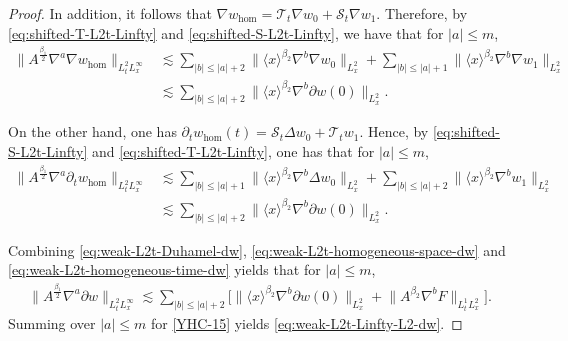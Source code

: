 \documentclass[11pt,twoside]{article}
\theoremstyle{plain}
\theoremstyle{definition}
\theoremstyle{assumption}
\numberwithin{equation}{section}
\begin{document}
\begin{proof}
		In addition, it follows that $\nabla w_{\mathrm{hom}}
		=\mathcal T_t\nabla w_0+\mathcal S_t\nabla w_1$.
		Therefore, by \eqref{eq:shifted-T-L2t-Linfty} and
		\eqref{eq:shifted-S-L2t-Linfty}, we have that for \(|a|\le m\),
		\begin{equation}
			\label{eq:weak-L2t-homogeneous-space-dw}
			\begin{aligned}
				\big\|
				A^{\frac{\beta_1}{2}}
				\nabla^a\nabla w_{\mathrm{hom}}
				\big\|_{L^2_tL^\infty_x}
				&\lesssim
				\sum_{|b|\le |a|+2}
				\big\|
				\langle x\rangle^{\beta_2}
				\nabla^b\nabla w_0
				\big\|_{L^2_x}
				+
				\sum_{|b|\le |a|+1}
				\big\|
				\langle x\rangle^{\beta_2}
				\nabla^b\nabla w_1
				\big\|_{L^2_x}\\
				&\lesssim
				\sum_{|b|\le |a|+2}
				\big\|
				\langle x\rangle^{\beta_2}
				\nabla^b\partial w(0)
				\big\|_{L^2_x}.
			\end{aligned}
		\end{equation}
		
		On the other hand, one has $
			\partial_t w_{\mathrm{hom}}(t)
			=\mathcal S_t\Delta w_0+\mathcal T_t w_1$.
		Hence, by \eqref{eq:shifted-S-L2t-Linfty} and
		\eqref{eq:shifted-T-L2t-Linfty}, one has that for \(|a|\le m\),
		\begin{equation}\label{eq:weak-L2t-homogeneous-time-dw}
			\begin{aligned}
				\big\|
				A^{\frac{\beta_1}{2}}
				\nabla^a\partial_t w_{\mathrm{hom}}
				\big\|_{L^2_tL^\infty_x}
				&\lesssim
				\sum_{|b|\le |a|+1}
				\big\|
				\langle x\rangle^{\beta_2}
				\nabla^b\Delta w_0
				\big\|_{L^2_x}
				+
				\sum_{|b|\le |a|+2}
				\big\|
				\langle x\rangle^{\beta_2}
				\nabla^b w_1
				\big\|_{L^2_x}
				\\
				&\lesssim
				\sum_{|b|\le |a|+2}
				\big\|
				\langle x\rangle^{\beta_2}
				\nabla^b\partial w(0)
				\big\|_{L^2_x}.
			\end{aligned}
		\end{equation}
		
		Combining \eqref{eq:weak-L2t-Duhamel-dw},
		\eqref{eq:weak-L2t-homogeneous-space-dw} and
		\eqref{eq:weak-L2t-homogeneous-time-dw} yields that for \(|a|\le m\),
		\begin{equation}\label{YHC-15}
		\begin{aligned}
		\big\|
		A^{\frac{\beta_1}{2}}\nabla^a\partial w
		\big\|_{L^2_tL^\infty_x}
		\lesssim
		\sum_{|b|\le |a|+2}
		\big[
		\big\|
		\langle x\rangle^{\beta_2}
		\nabla^b\partial w(0)
		\big\|_{L^2_x}
		+\big\|
		A^{\beta_2}\nabla^bF
		\big\|_{L^1_tL^2_x}
		\big].
		\end{aligned}
		\end{equation}
		Summing over \(|a|\le m\) for \eqref{YHC-15} yields
		\eqref{eq:weak-L2t-Linfty-L2-dw}.
	\end{proof}
	
\end{document}
